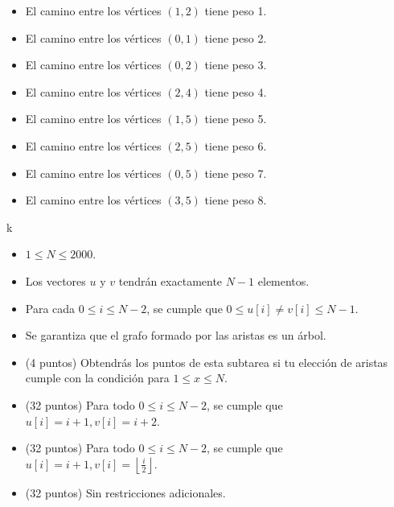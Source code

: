 \documentclass[12pt]{scrartcl}
\begin{document}
\begin{itemize}
\begin{itemize}
                \item El camino entre los vértices $(1, 2)$ tiene peso 1.
                \item El camino entre los vértices $(0, 1)$ tiene peso 2.
                \item El camino entre los vértices $(0, 2)$ tiene peso 3.
                \item El camino entre los vértices $(2, 4)$ tiene peso 4.
                \item El camino entre los vértices $(1, 5)$ tiene peso 5.
                \item El camino entre los vértices $(2, 5)$ tiene peso 6.
                \item El camino entre los vértices $(0, 5)$ tiene peso 7.
                \item El camino entre los vértices $(3, 5)$ tiene peso 8.
            \end{itemize}
        \end{itemize}
        k

        \begin{itemize}
            \item $1 \le N \le 2000$.
            \item Los vectores $u$ y $v$ tendrán exactamente $N - 1$ elementos.
            \item Para cada $0 \le i \le N - 2$, se cumple que $0 \le u[i] \neq v[i] \le N - 1$. 
            \item Se garantiza que el grafo formado por las aristas es un árbol.
        \end{itemize}
    


    \begin{itemize}
        \item (4 puntos) Obtendrás los puntos de esta subtarea si tu elección de aristas cumple con la condición para $1 \le x \le N$.
        \item (32 puntos) Para todo $0 \le i \le N - 2$, se cumple que $u[i] = i + 1, v[i] = i + 2$.
        \item (32 puntos) Para todo $0 \le i \le N - 2$, se cumple que $u[i] = i + 1, v[i] = \left\lfloor\frac{i}{2} \right\rfloor$.
        \item (32 puntos) Sin restricciones adicionales.
    \end{itemize}
\end{document}
